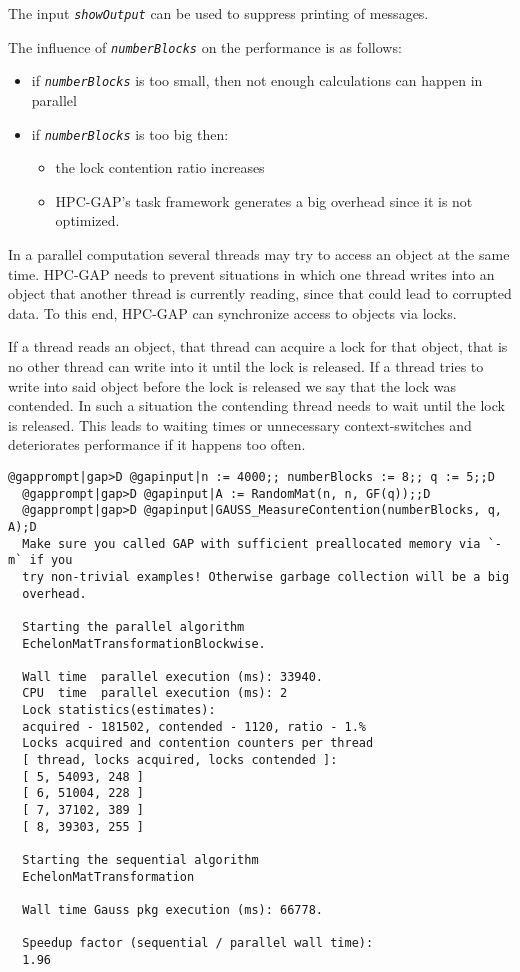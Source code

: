 \documentclass[a4paper,11pt]{report}
\begin{document}
{{{ The input \mbox{\texttt{\mdseries\slshape showOutput}} can be used to suppress printing of messages. 

 The influence of \mbox{\texttt{\mdseries\slshape numberBlocks}} on the performance is as follows: 
\begin{itemize}
\item  if \mbox{\texttt{\mdseries\slshape numberBlocks}} is too small, then not enough calculations can happen in parallel 
\item  if \mbox{\texttt{\mdseries\slshape numberBlocks}} is too big then: 
\begin{itemize}
\item  the lock contention ratio increases 
\item  HPC-GAP's task framework generates a big overhead since it is not optimized. 
\end{itemize}
 
\end{itemize}
 

 In a parallel computation several threads may try to access an object at the
same time. HPC-GAP needs to prevent situations in which one thread writes into
an object that another thread is currently reading, since that could lead to
corrupted data. To this end, HPC-GAP can synchronize access to objects via
locks. 

 If a thread reads an object, that thread can acquire a lock for that object,
that is no other thread can write into it until the lock is released. If a
thread tries to write into said object before the lock is released we say that
the lock was contended. In such a situation the contending thread needs to
wait until the lock is released. This leads to waiting times or unnecessary
context-switches and deteriorates performance if it happens too often. 

 
\begin{Verbatim}[commandchars=@|D,fontsize=\small,frame=single,label=Example]
  @gapprompt|gap>D @gapinput|n := 4000;; numberBlocks := 8;; q := 5;;D
  @gapprompt|gap>D @gapinput|A := RandomMat(n, n, GF(q));;D
  @gapprompt|gap>D @gapinput|GAUSS_MeasureContention(numberBlocks, q, A);D
  Make sure you called GAP with sufficient preallocated memory via `-m` if you
  try non-trivial examples! Otherwise garbage collection will be a big
  overhead.
  
  Starting the parallel algorithm
  EchelonMatTransformationBlockwise.
  
  Wall time  parallel execution (ms): 33940.
  CPU  time  parallel execution (ms): 2
  Lock statistics(estimates):
  acquired - 181502, contended - 1120, ratio - 1.%
  Locks acquired and contention counters per thread
  [ thread, locks acquired, locks contended ]:
  [ 5, 54093, 248 ]
  [ 6, 51004, 228 ]
  [ 7, 37102, 389 ]
  [ 8, 39303, 255 ]
  
  Starting the sequential algorithm
  EchelonMatTransformation
  
  Wall time Gauss pkg execution (ms): 66778.
  
  Speedup factor (sequential / parallel wall time):
  1.96
\end{Verbatim}
 }

 }

 }
\end{document}
